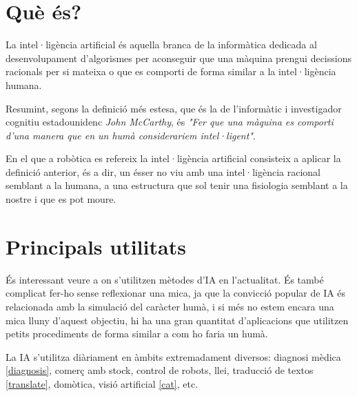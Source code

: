 \section{Què és?}

La intel·ligència artificial és aquella branca de la informàtica dedicada al
desenvolupament d'algorismes per aconseguir que una màquina prengui decissions
 racionals per si mateixa o que es comporti de forma similar a la intel·ligència humana.

Resumint, segons la definició més estesa, que és la de l'informàtic i
investigador cognitiu estadounidenc \emph{John McCarthy}, és \emph{"Fer que una màquina
es comporti d'una manera que en un humà considerariem intel·ligent"}.

En el que a robòtica es refereix la intel·ligència artificial consisteix a aplicar la
definició anterior, és a dir, un ésser no viu amb una intel·ligència racional semblant
a la humana, a una estructura que sol tenir una fisiologia semblant a la nostre i que
es pot moure.
\cite{definiciondeia} \cite{wikiia} \cite{monoia}

\section{Principals utilitats}

És interessant veure a on s'utilitzen mètodes d'IA en l'actualitat. És també complicat fer-ho sense reflexionar una mica, ja que la convicció popular de IA és relacionada amb la simulació del caràcter humà, i si més no estem encara una mica lluny d'aquest objectiu, hi ha una gran quantitat d'aplicacions que utilitzen petits procediments de forma similar a com ho faria un humà.

La IA s'utilitza diàriament en àmbits extremadament diversos: diagnosi mèdica \ref{diagnosis}, comerç amb stock, control de robots, llei, traducció de textos \ref{translate}, domòtica, visió artificial \ref{cat}, etc.


